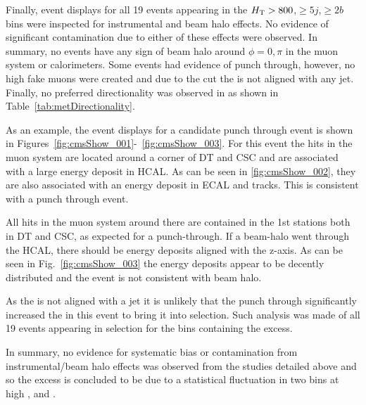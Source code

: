 Finally, event displays for all 19 events appearing in the $\mbox{$H_\text{T}$} > 800$,$\geq5j$,$\ge2b$ bins
were inspected for instrumental and beam halo effects. No evidence of significant contamination
due to either of these effects were observed. In summary, no events have any sign of beam halo
around $\phi = 0,\pi$ in the muon system or calorimeters. Some events had evidence of punch 
through, however, no high \pt fake muons were created and due to the \bdphi cut the \met is
not aligned with any jet. Finally, no preferred directionality was observed in \met as shown
in Table~\ref{tab:metDirectionality}.



As an example, the event displays for a candidate punch through event is shown in 
Figures~\ref{fig:cmsShow_001}-~\ref{fig:cmsShow_003}.
For this event the hits in the muon system are located around a corner of DT and
CSC and are associated with a large energy deposit in HCAL. As can be seen
in \ref{fig:cmsShow_002}, they are also associated with an energy deposit in ECAL and tracks.
This is consistent with a punch through event.

All hits in the muon system around there are contained in the 1st
stations both in DT and CSC, as expected for a punch-through. 
If a beam-halo went through the HCAL, there should be energy deposits
aligned with the z-axis. As can be seen in Fig.~\ref{fig:cmsShow_003} the energy deposits
appear to be decently distributed and the event is not consistent with beam halo.

As the \met is not aligned with a jet it is unlikely that the punch through
significantly increased the \met in this event to bring it into selection. 
Such analysis was made of all 19 events appearing in selection for the bins
containing the excess.

In summary, no evidence for systematic bias or contamination from 
instrumental/beam halo effects was observed from the studies detailed above
and so the excess is concluded to be due to a statistical fluctuation 
in two bins at high \njet, \nb and \scalht. 

